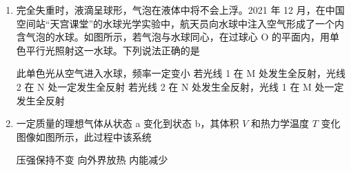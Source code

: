 \documentclass[\gkver]{gaokaozhenti}
\begin{document}
\begin{enumerate}
{$F_{2y} - F_{1y} = \frac{mg \sin \alpha \cos \beta}{\sin (\alpha + \beta)} - \frac{mg \sin \beta \cos \alpha}{\sin (\alpha + \beta)} = \frac{mg (\sin \alpha \cos \beta - \sin \beta \cos \alpha)}{\sin (\alpha + \beta)}$

因 $\sin \alpha \cos \beta - \cos \alpha \sin \beta = \sin (\alpha - \beta) > 0$

可知 $F_{2y} > F_{1y}$，选项 AB 错误。
}

\item
完全失重时，液滴呈球形，气泡在液体中将不会上浮。2021 年 12 月，在中国空间站“天宫课堂”的水球光学实验中，航天员向水球中注入空气形成了一个内含气泡的水球。如图所示，若气泡与水球同心，在过球心 O 的平面内，用单色平行光照射这一水球。下列说法正确的是

\onepicture[w=4.60cm]{}

{此单色光从空气进入水球，频率一定变小}
{若光线 1 在 M 处发生全反射，光线 2 在 N 处一定发生全反射}
{若光线 2 在 N 处发生全反射，光线 1 在 M 处一定发生全反射}


\item
一定质量的理想气体从状态 a 变化到状态 b，其体积 $V$ 和热力学温度 $T$ 变化图像如图所示，此过程中该系统


{压强保持不变}
{向外界放热}
{内能减少}


\end{enumerate}
\end{document}
